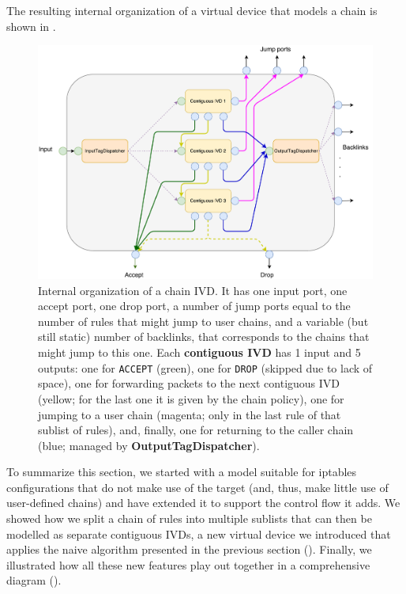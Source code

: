The resulting internal organization of a virtual device that models a chain is
shown in .

\begin{figure}[h]
  \centering
  \captionsetup{justification=centering}
  \includegraphics[scale=0.5]{src/img/chain-internal}
  \caption[Internal organization of a chain IVD.]{Internal organization of a
  chain IVD.  It has one input port, one accept port, one drop port, a number
  of jump ports equal to the number of rules that might jump to user chains,
  and a variable (but still static) number of backlinks, that corresponds to
  the chains that might jump to this one.  Each \textbf{contiguous IVD} has 1
  input and 5 outputs: one for \texttt{ACCEPT} (green), one for \texttt{DROP}
  (skipped due to lack of space), one for forwarding packets to the next
  contiguous IVD (yellow; for the last one it is given by the chain policy),
  one for jumping to a user chain (magenta; only in the last rule of that
  sublist of rules), and, finally, one for returning to the caller chain (blue;
  managed by \textbf{OutputTagDispatcher}).}
  \label{fig:chain-internal}
\end{figure}

\bigskip

To summarize this section, we started with a model suitable for iptables
configurations that do not make use of the \RETURN target (and, thus, make
little use of user-defined chains) and have extended it to support the control
flow it adds.  We showed how we split a chain of rules into multiple sublists
that can then be modelled as separate contiguous IVDs, a new virtual device we
introduced that applies the naive algorithm presented in the previous section
().  Finally, we illustrated how
all these new features play out together in a comprehensive diagram
().


